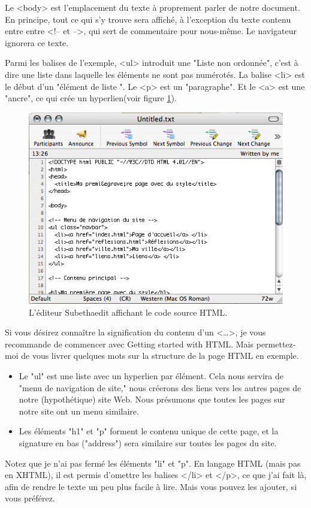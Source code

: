  Le <body> est l'emplacement du texte à proprement parler de notre document. En principe, tout ce qui s'y trouve sera affiché, à l'exception du texte contenu entre entre <!-- et -->, qui sert de commentaire pour nous-même. Le navigateur ignorera ce texte.
 
 Parmi les balises de l'exemple, <ul> introduit une "Liste non ordonnée", c'est à dire une liste dans laquelle les éléments ne sont pas numérotés. La balise <li> est le début d'un "élément de liste ". Le <p> est un "paragraphe". Et le <a> est une "ancre", ce qui crée un hyperlien(voir figure \ref{fig:screen2}). 

\begin{figure}[t]
	\begin{center}
		\caption{L'éditeur Subethaedit affichant le code source HTML.}
		\label{fig:screen2}
		\includegraphics{voronin/img/capture.png}	
	\end{center}
\end{figure}
Si vous désirez connaître la signification du contenu d'un <…>, je vous recommande de commencer avec Getting started with HTML. Mais permettez-moi de vous livrer quelques mots sur la structure de la page HTML en exemple.
\begin{itemize}
	\item Le "ul" est une liste avec un hyperlien par élément. Cela nous servira de "menu de navigation de site," nous créerons des liens vers les autres pages de notre (hypothétique) site Web. Nous présumons que toutes les pages sur notre site ont un menu similaire.
	\item Les éléments "h1" et "p" forment le contenu unique de cette page, et la signature en bas ("address") sera similaire sur toutes les pages du site. 
\end{itemize}
Notez que je n'ai pas fermé les éléments "li" et "p". En langage HTML (mais pas en XHTML), il est permis d'omettre les balises </li> et </p>, ce que j'ai fait là, afin de rendre le texte un peu plus facile à lire. Mais vous pouvez les ajouter, si vous préférez. 
\normalsize

